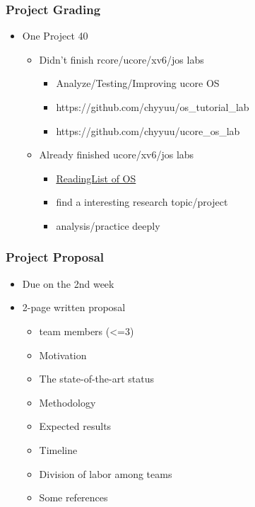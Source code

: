 \begin{frame}[plain]	
	\frametitle{Project Grading}
	
	\begin{itemize}\Large
		\item One Project		40%
		\begin{itemize}\large
			\item Didn't finish rcore/ucore/xv6/jos labs
			\begin{itemize}\large
				\item Analyze/Testing/Improving ucore OS
				\item https://github.com/chyyuu/os\_tutorial\_lab
				\item https://github.com/chyyuu/ucore\_os\_lab
				
			\end{itemize}
			\item Already finished ucore/xv6/jos labs
			\begin{itemize}\large
				\item \href{https://github.com/chyyuu/aos_course/blob/master/readinglist.md}{ReadingList of OS}
				\item find a interesting research topic/project
				\item analysis/practice deeply
			\end{itemize}
		\end{itemize}
	\end{itemize}
	
	
\end{frame}

\begin{frame}[plain]	
	\frametitle{Project Proposal}
	
	\begin{itemize}\Large
		\item Due on the 2nd week
		\item 2-page written proposal
		\begin{itemize}\large
			\item team members (<=3)
			\item Motivation
			\item The state-of-the-art status
			\item Methodology
			\item Expected results
			\item Timeline
			\item Division of labor among teams
			\item Some references
			
		\end{itemize}
	\end{itemize}
	
	
\end{frame}

